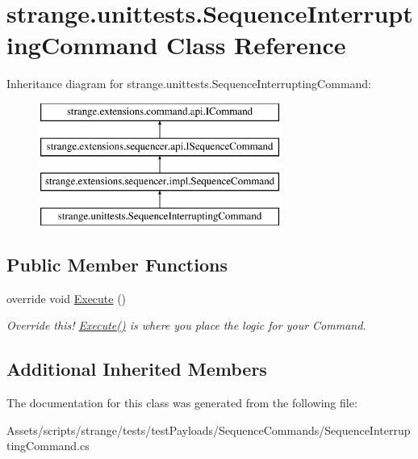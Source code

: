 \hypertarget{classstrange_1_1unittests_1_1_sequence_interrupting_command}{\section{strange.\-unittests.\-Sequence\-Interrupting\-Command Class Reference}
\label{classstrange_1_1unittests_1_1_sequence_interrupting_command}
}
Inheritance diagram for strange.\-unittests.\-Sequence\-Interrupting\-Command\-:\begin{figure}[H]
\begin{center}
\leavevmode
\includegraphics[height=4.000000cm]{classstrange_1_1unittests_1_1_sequence_interrupting_command}
\end{center}
\end{figure}
\subsection*{Public Member Functions}
\begin{DoxyCompactItemize}
\item 
\hypertarget{classstrange_1_1unittests_1_1_sequence_interrupting_command_a554a7a7cdb17afefc5427cd5f7cf9bf7}{override void \hyperlink{classstrange_1_1unittests_1_1_sequence_interrupting_command_a554a7a7cdb17afefc5427cd5f7cf9bf7}{Execute} ()}\label{classstrange_1_1unittests_1_1_sequence_interrupting_command_a554a7a7cdb17afefc5427cd5f7cf9bf7}

\begin{DoxyCompactList}\small\item\em Override this! {\ttfamily \hyperlink{classstrange_1_1unittests_1_1_sequence_interrupting_command_a554a7a7cdb17afefc5427cd5f7cf9bf7}{Execute()}} is where you place the logic for your Command. \end{DoxyCompactList}\end{DoxyCompactItemize}
\subsection*{Additional Inherited Members}


The documentation for this class was generated from the following file\-:\begin{DoxyCompactItemize}
\item 
Assets/scripts/strange/tests/test\-Payloads/\-Sequence\-Commands/Sequence\-Interrupting\-Command.\-cs\end{DoxyCompactItemize}
